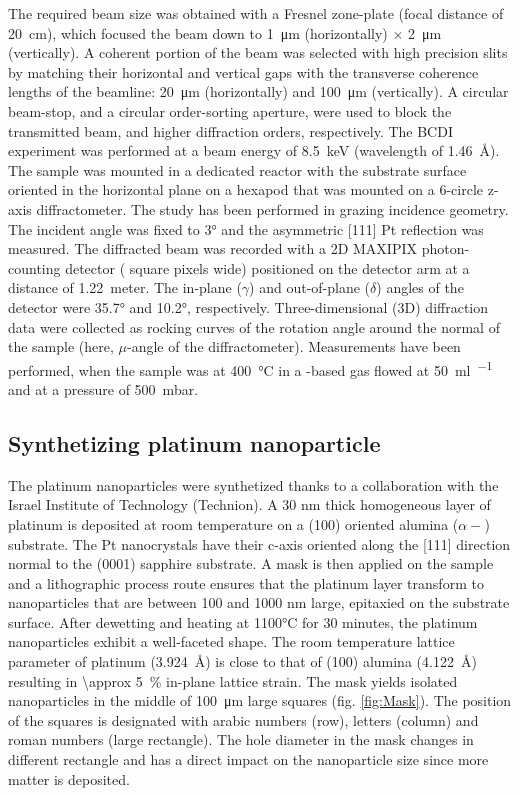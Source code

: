 The required beam size was obtained with a Fresnel zone-plate (focal distance of \qty{20}{\cm}), which focused the beam down to \qty{1}{\um} (horizontally) $\times$ \qty{2}{\um} (vertically).
A coherent portion of the beam was selected with high precision slits by matching their horizontal and vertical gaps with the transverse coherence lengths of the beamline: \qty{20}{\um} (horizontally) and \qty{100}{\um} (vertically).
A circular beam-stop, and a circular order-sorting aperture, were used to block the transmitted beam, and higher diffraction orders, respectively.
The BCDI experiment was performed at a beam energy of \qty{8.5}{\keV} (wavelength of \qty{1.46}{\angstrom}). The sample was mounted in a dedicated reactor with the substrate surface oriented in the horizontal plane on a hexapod that was mounted on a 6-circle z-axis diffractometer.
The study has been performed in grazing incidence geometry.
The incident angle was fixed to \ang{3} and the asymmetric [111] Pt reflection was measured.
The diffracted beam was recorded with a 2D MAXIPIX photon-counting detector ( square pixels  wide) positioned on the detector arm at a distance of \qty{1.22}{meter}.
The in-plane ($\gamma$) and out-of-plane ($\delta$) angles of the detector were \ang{35.7} and \ang{10.2}, respectively.
Three-dimensional (3D) diffraction data were collected as rocking curves of the rotation angle around the normal of the sample (here, $\mu$-angle of the diffractometer).
Measurements have been performed, when the sample was at \qty{400}{\degreeCelsius} in a \argon-based gas flowed at \qty{50}{\ml\per\min} and at a pressure of \qty{500}{\milli\bar}.

\subsection{Synthetizing platinum nanoparticle}

The platinum nanoparticles were synthetized thanks to a collaboration with the Israel Institute of Technology (Technion).
A 30 nm thick homogeneous layer of platinum is deposited at room temperature on a (100) oriented alumina ($\alpha-$) substrate.
The Pt nanocrystals have their c-axis oriented along the [111] direction normal to the (0001) sapphire substrate.
A mask is then applied on the sample and a lithographic process route ensures that the platinum layer transform to nanoparticles that are between 100 and 1000 nm large,  epitaxied on the substrate surface.
After dewetting and heating at 1100°C for 30 minutes, the platinum nanoparticles exhibit a well-faceted shape.
The room temperature lattice parameter of platinum (\qty{3.924}{\angstrom}) is close to that of (100) alumina (\qty{4.122}{\angstrom}) resulting in \qty{\approx 5}{\percent} in-plane lattice strain.
The mask yields isolated nanoparticles in the middle of \qty{100}{\um} large squares (fig. \ref{fig:Mask}).
The position of the squares is designated with arabic numbers (row), letters (column) and roman numbers (large rectangle).
The hole diameter in the mask changes in different rectangle and has a direct impact on the nanoparticle size since more matter is deposited.

